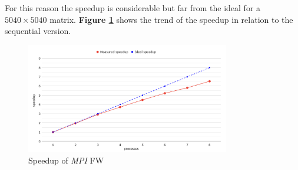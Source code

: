 For this reason the speedup is considerable but far from the ideal for a $5040\times5040$ matrix. \textbf{Figure \ref*{fig:mpi-speedup}} shows the trend of the speedup in relation to the 
sequential version.

\begin{figure}[h!]
\centering                                                                        
\includegraphics[width=3.5in]{diagrams/mpi-speedup}
\captionsetup{justification=centering}                                                                                                                                   
\caption{Speedup of \emph{MPI} FW}                                                                                                                                            
\label{fig:mpi-speedup}                                                                                                                                                           
\end{figure}

